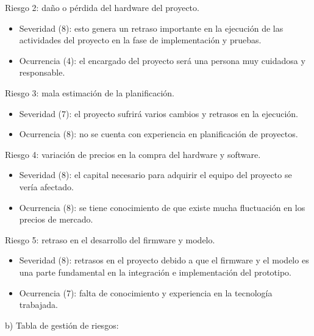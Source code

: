 \documentclass[
11pt, %
]{charter}
\begin{document}
Riesgo 2: daño o pérdida del hardware del proyecto.
\begin{itemize}
	\item Severidad (8): esto genera un retraso importante en la ejecución de las actividades del proyecto en la fase de implementación y pruebas.\\
	\item Ocurrencia (4): el encargado del proyecto será una persona muy cuidadosa y responsable.\\
\end{itemize}

Riesgo 3: mala estimación de la planificación.
\begin{itemize}
	\item Severidad (7): el proyecto sufrirá varios cambios y retrasos en la ejecución.\\
	\item Ocurrencia (8): no se cuenta con experiencia en planificación de proyectos.\\
\end{itemize}

Riesgo 4: variación de precios en la compra del hardware y software.
\begin{itemize}
	\item Severidad (8): el capital necesario para adquirir el equipo del proyecto se vería afectado.\\
	\item Ocurrencia (8): se tiene conocimiento de que existe mucha fluctuación en los precios de mercado.\\
\end{itemize}

Riesgo 5: retraso en el desarrollo del firmware y modelo.
\begin{itemize}
	\item Severidad (8): retrasos en el proyecto debido a que el firmware y el modelo es una parte fundamental en la integración e implementación del prototipo.\\
	\item Ocurrencia (7): falta de conocimiento y experiencia en la tecnología trabajada.\\
\end{itemize}

b) Tabla de gestión de riesgos:
\end{document}
